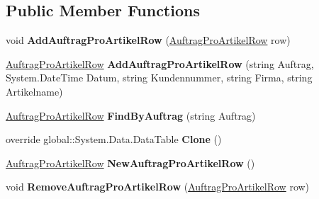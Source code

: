 \subsection*{Public Member Functions}
\begin{DoxyCompactItemize}
\item 
void {\bfseries Add\+Auftrag\+Pro\+Artikel\+Row} (\hyperlink{class_products_1_1_data_1_1ds_sage_1_1_auftrag_pro_artikel_row}{Auftrag\+Pro\+Artikel\+Row} row)\hypertarget{class_products_1_1_data_1_1ds_sage_1_1_auftrag_pro_artikel_data_table_a949eee26d1a46ff2898bf2af9bf55a24}{}\label{class_products_1_1_data_1_1ds_sage_1_1_auftrag_pro_artikel_data_table_a949eee26d1a46ff2898bf2af9bf55a24}

\item 
\hyperlink{class_products_1_1_data_1_1ds_sage_1_1_auftrag_pro_artikel_row}{Auftrag\+Pro\+Artikel\+Row} {\bfseries Add\+Auftrag\+Pro\+Artikel\+Row} (string Auftrag, System.\+Date\+Time Datum, string Kundennummer, string Firma, string Artikelname)\hypertarget{class_products_1_1_data_1_1ds_sage_1_1_auftrag_pro_artikel_data_table_aec267f0808cac96a0ffd457d93bab3ca}{}\label{class_products_1_1_data_1_1ds_sage_1_1_auftrag_pro_artikel_data_table_aec267f0808cac96a0ffd457d93bab3ca}

\item 
\hyperlink{class_products_1_1_data_1_1ds_sage_1_1_auftrag_pro_artikel_row}{Auftrag\+Pro\+Artikel\+Row} {\bfseries Find\+By\+Auftrag} (string Auftrag)\hypertarget{class_products_1_1_data_1_1ds_sage_1_1_auftrag_pro_artikel_data_table_aeec061c8cc8a579a5ef0f140876930b2}{}\label{class_products_1_1_data_1_1ds_sage_1_1_auftrag_pro_artikel_data_table_aeec061c8cc8a579a5ef0f140876930b2}

\item 
override global\+::\+System.\+Data.\+Data\+Table {\bfseries Clone} ()\hypertarget{class_products_1_1_data_1_1ds_sage_1_1_auftrag_pro_artikel_data_table_a836ac52eb714bdc3bc6b59b1d734eab0}{}\label{class_products_1_1_data_1_1ds_sage_1_1_auftrag_pro_artikel_data_table_a836ac52eb714bdc3bc6b59b1d734eab0}

\item 
\hyperlink{class_products_1_1_data_1_1ds_sage_1_1_auftrag_pro_artikel_row}{Auftrag\+Pro\+Artikel\+Row} {\bfseries New\+Auftrag\+Pro\+Artikel\+Row} ()\hypertarget{class_products_1_1_data_1_1ds_sage_1_1_auftrag_pro_artikel_data_table_a219bafe176d55eb3857d64b2fd93bbb7}{}\label{class_products_1_1_data_1_1ds_sage_1_1_auftrag_pro_artikel_data_table_a219bafe176d55eb3857d64b2fd93bbb7}

\item 
void {\bfseries Remove\+Auftrag\+Pro\+Artikel\+Row} (\hyperlink{class_products_1_1_data_1_1ds_sage_1_1_auftrag_pro_artikel_row}{Auftrag\+Pro\+Artikel\+Row} row)\hypertarget{class_products_1_1_data_1_1ds_sage_1_1_auftrag_pro_artikel_data_table_a47eddcadbbf72bfd98897c3fb21b2765}{}\label{class_products_1_1_data_1_1ds_sage_1_1_auftrag_pro_artikel_data_table_a47eddcadbbf72bfd98897c3fb21b2765}

\end{DoxyCompactItemize}
